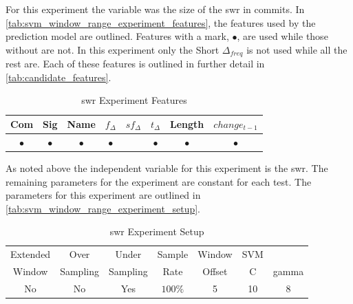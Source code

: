 
For this experiment the variable was the size of the \gls{swr} in commits. In \autoref{tab:svm_window_range_experiment_features}, the features used by the prediction model are outlined. Features with a mark, $\bullet$, are used while those without are not. In this experiment only the Short $\Delta_{freq}$ is not used while all the rest are. Each of these features is outlined in further detail in \autoref{tab:candidate_features}.

\begin{table}[h]
\begin{center}

    \begin{tabular}{|c|c|c|c|c|c|c|c|}
        \hline
        Com & Sig & Name & $f_{\Delta}$ & $sf_{\Delta}$ & $t_\Delta$ & Length & $change_{t-1}$ \\
        \hline
        $\bullet$ & $\bullet$ & $\bullet$ & $\bullet$ & & $\bullet$ & $\bullet$ & $\bullet$ \\ \hline
    \end{tabular}
    \caption{\gls{swr} Experiment Features}
    \label{tab:svm_window_range_experiment_features}
\end{center}
\end{table}


As noted above the independent variable for this experiment is the \gls{swr}. The remaining parameters for the experiment are constant for each test. The parameters for this experiment are outlined in \autoref{tab:svm_window_range_experiment_setup}.

\begin{table}[h]
\begin{center}

    \begin{tabular}{|c|c|c|c|c|cc|}
        \hline
        Extended & Over & Under & Sample & Window & SVM & \\
        Window & Sampling & Sampling & Rate & Offset & C & gamma \\ \hline
        No & No & Yes & $100\%$ & 5 & 10 & 8 \\ \hline
    \end{tabular}
    \caption{\gls{swr} Experiment Setup}
    \label{tab:svm_window_range_experiment_setup}
\end{center}

\end{table}

